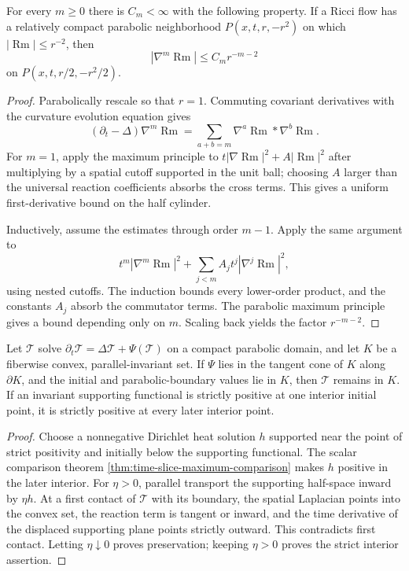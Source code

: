 \begin{theorem}
\label{thm:local-ricci-flow-derivative-estimates}
\notready
For every $m\ge0$ there is $C_m<\infty$ with the following property.  If a
Ricci flow has a relatively compact parabolic neighborhood
$P(x,t,r,-r^2)$ on which $|\operatorname{Rm}|\le r^{-2}$, then
\[
 |\nabla^m\operatorname{Rm}|
 \le C_m r^{-m-2}
\]
on $P(x,t,r/2,-r^2/2)$.
\end{theorem}

\begin{proof}
Parabolically rescale so that $r=1$.  Commuting covariant derivatives with
the curvature evolution equation gives
\[
 (\partial_t-\Delta)\nabla^m\operatorname{Rm}
 =\sum_{a+b=m}\nabla^a\operatorname{Rm}*\nabla^b\operatorname{Rm}.
\]
For $m=1$, apply the maximum principle to
$t|\nabla\operatorname{Rm}|^2+A|\operatorname{Rm}|^2$ after multiplying by
a spatial cutoff supported in the unit ball; choosing $A$ larger than the
universal reaction coefficients absorbs the cross terms.  This gives a
uniform first-derivative bound on the half cylinder.

Inductively, assume the estimates through order $m-1$.  Apply the same
argument to
\[
 t^m|\nabla^m\operatorname{Rm}|^2
 +\sum_{j<m}A_jt^j|\nabla^j\operatorname{Rm}|^2,
\]
using nested cutoffs.  The induction bounds every lower-order product, and
the constants $A_j$ absorb the commutator terms.  The parabolic maximum
principle gives a bound depending only on $m$.  Scaling back yields the
factor $r^{-m-2}$.
\end{proof}

\begin{theorem}
\label{thm:strong-curvature-tensor-maximum-principle}
\notready
Let $\mathcal T$ solve
$\partial_t\mathcal T=\Delta\mathcal T+\Psi(\mathcal T)$ on a compact
parabolic domain, and let $K$ be a fiberwise convex, parallel-invariant set.
If $\Psi$ lies in the tangent cone of $K$ along $\partial K$, and the initial
and parabolic-boundary values lie in $K$, then $\mathcal T$ remains in $K$.
If an invariant supporting functional is strictly positive at one interior
initial point, it is strictly positive at every later interior point.
\end{theorem}

\begin{proof}
Choose a nonnegative Dirichlet heat solution $h$ supported near the point of
strict positivity and initially below the supporting functional.  The scalar
comparison theorem \ref{thm:time-slice-maximum-comparison} makes $h$ positive
in the later interior.  For $\eta>0$, parallel transport the supporting
half-space inward by $\eta h$.  At a first contact of $\mathcal T$ with its
boundary, the spatial Laplacian points into the convex set, the reaction term
is tangent or inward, and the time derivative of the displaced supporting
plane points strictly outward.  This contradicts first contact.  Letting
$\eta\downarrow0$ proves preservation; keeping $\eta>0$ proves the strict
interior assertion.
\end{proof}

